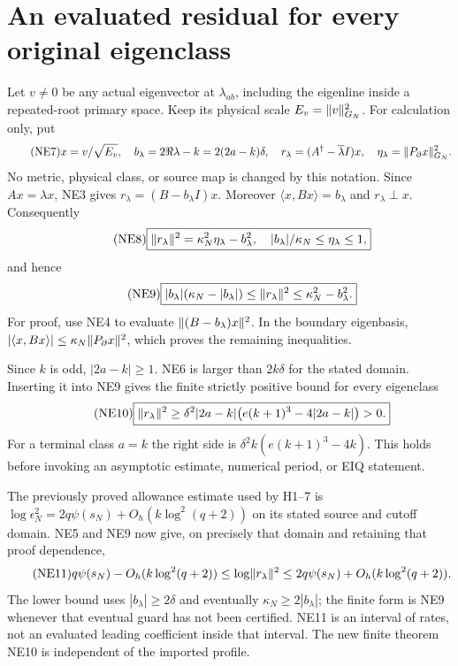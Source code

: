 \documentclass[11pt]{article}
\begin{document}
\section{An evaluated residual for every original eigenclass}
Let $v\ne0$ be any actual eigenvector at $\lambda_{ab}$, including
the eigenline inside a repeated-root primary space. Keep its physical
scale $E_v=\lVert v\rVert_{G_N}^2$. For calculation only, put
\begin{equation}\tag{NE7}
x=v/\sqrt{E_v},\quad b_\lambda=2\Re\lambda-k=2(2a-k)\delta,
\quad r_\lambda=(A^\dagger-\overline\lambda I)x,
\quad \eta_\lambda=\lVert P_\partial x\rVert_{G_N}^2.
\end{equation}
No metric, physical class, or source map is changed by this notation.
Since $Ax=\lambda x$, NE3 gives $r_\lambda=(B-b_\lambda I)x$.
Moreover $\langle x,Bx\rangle=b_\lambda$ and
$r_\lambda\perp x$. Consequently
\begin{equation}\tag{NE8}
\boxed{\lVert r_\lambda\rVert^2=\kappa_N^2\eta_\lambda-b_\lambda^2,
\quad |b_\lambda|/\kappa_N\le\eta_\lambda\le1,}
\end{equation}
and hence
\begin{equation}\tag{NE9}
\boxed{|b_\lambda|(\kappa_N-|b_\lambda|)
\le\lVert r_\lambda\rVert^2\le\kappa_N^2-b_\lambda^2.}
\end{equation}
For proof, use NE4 to evaluate $\lVert(B-b_\lambda)x\rVert^2$.
In the boundary eigenbasis,
$|\langle x,Bx\rangle|\le\kappa_N\lVert P_\partial x\rVert^2$,
which proves the remaining inequalities.

Since $k$ is odd, $|2a-k|\ge1$. NE6 is larger than $2k\delta$
for the stated domain. Inserting it into NE9 gives the finite
strictly positive bound for every eigenclass
\begin{equation}\tag{NE10}
\boxed{\lVert r_\lambda\rVert^2\ge
\delta^2|2a-k|\bigl(e(k+1)^3-4|2a-k|\bigr)>0.}
\end{equation}
For a terminal class $a=k$ the right side is
$\delta^2k(e(k+1)^3-4k)$. This holds before invoking an asymptotic
estimate, numerical period, or EIQ statement.

The previously proved allowance estimate used by H1--7
\cite{ne-Heat} is
$\log\epsilon_N^2=2q\psi(s_N)+O_h(k\log^2(q+2))$ on its stated
source and cutoff domain. NE5 and NE9 now give, on precisely that
domain and retaining that proof dependence,
\begin{equation}\tag{NE11}
q\psi(s_N)-O_h(k\log^2(q+2))
\le\log\lVert r_\lambda\rVert^2
\le2q\psi(s_N)+O_h(k\log^2(q+2)).
\end{equation}
The lower bound uses $|b_\lambda|\ge2\delta$ and eventually
$\kappa_N\ge2|b_\lambda|$; the finite form is NE9 whenever that
eventual guard has not been certified. NE11 is an interval of rates,
not an evaluated leading coefficient inside that interval. The new
finite theorem NE10 is independent of the imported profile.
\end{document}
